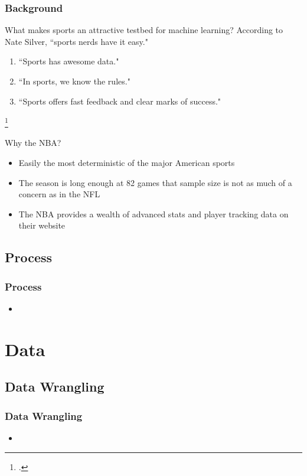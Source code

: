 \documentclass{beamer}
\begin{document}
\begin{frame}
\frametitle{Background}
\begin{block}{What makes sports an attractive testbed for machine learning?}
According to Nate Silver, ``sports nerds have it easy."\footnotemark
\begin{enumerate}
    \item ``Sports has awesome data."
    \item ``In sports, we know the rules."
    \item ``Sports offers fast feedback and clear marks of success."
\end{enumerate}
\end{block}
\footcitetext{silver-online}
\begin{block}{Why the NBA?}
\begin{itemize}
    \item Easily the most deterministic of the major American sports
    \item The season is long enough at 82 games that sample size is not as much of a concern as in the NFL
    \item The NBA provides a wealth of advanced stats and player tracking data on their website
\end{itemize}
\end{block}
\end{frame}

\subsection{Process}
\begin{frame}
\frametitle{Process}
\begin{itemize}
    \item
\end{itemize}
\end{frame}

\section{Data}

\subsection{Data Wrangling}
\begin{frame}
\frametitle{Data Wrangling}
\begin{itemize}
    \item
\end{itemize}
\end{frame}
\end{document}
